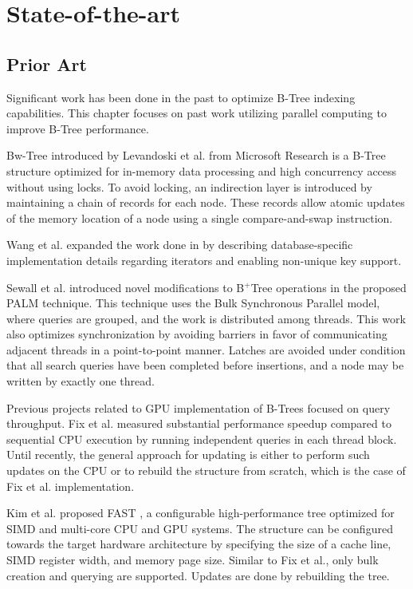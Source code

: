\chapter{State-of-the-art}\label{chapter:state-of-art}

\section{Prior Art}

Significant work has been done in the past to optimize B-Tree indexing capabilities. This chapter focuses on past work utilizing parallel computing to improve B-Tree performance.

Bw-Tree introduced by Levandoski et al. \cite{bw-tree} from Microsoft Research is a B-Tree structure optimized for in-memory data processing and high concurrency access without using locks. To avoid locking, an indirection layer is introduced by maintaining a chain of records for each node. These records allow atomic updates of the memory location of a node using a single compare-and-swap instruction.

Wang et al. \cite{openbw-tree} expanded the work done in \cite{bw-tree} by describing database-specific implementation details regarding iterators and enabling non-unique key support.

Sewall et al. \cite{palm} introduced novel modifications to B$^+$Tree operations in the proposed PALM technique. This technique uses the Bulk Synchronous Parallel model, where queries are grouped, and the work is distributed among threads. This work also optimizes synchronization by avoiding barriers in favor of communicating adjacent threads in a point-to-point manner. Latches are avoided under condition that all search queries have been completed before insertions, and a node may be written by exactly one thread.

Previous projects related to GPU implementation of B-Trees focused on query throughput. Fix et al. \cite{fix2011accelerating} measured substantial performance speedup compared to sequential CPU execution by running independent queries in each thread block. Until recently, the general approach for updating is either to perform such updates on the CPU or to rebuild the structure from scratch, which is the case of Fix et al. implementation.

Kim et al. proposed FAST \cite{fast}, a configurable high-performance tree optimized for SIMD and multi-core CPU and GPU systems. The structure can be configured towards the target hardware architecture by specifying the size of a cache line, SIMD register width, and memory page size. Similar to Fix et al., only bulk creation and querying are supported. Updates are done by rebuilding the tree.


